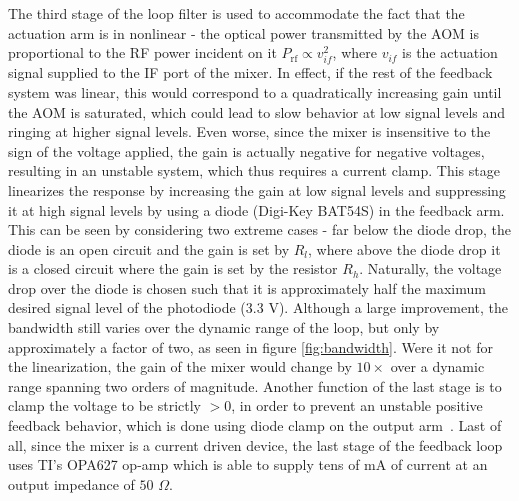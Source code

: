 \documentclass[twocolumn,aps,pra,showpacs,preprintnumbers,bibnotes]{revtex4-1}
\begin{document}
The third stage of the loop filter is used to accommodate the fact that the actuation arm is in nonlinear - the optical power transmitted by the AOM is proportional to the RF power incident on it $P_{\mathrm{rf}}\propto v_{if}^2$, where $v_{if}$ is the actuation signal supplied to the IF port of the mixer.
In effect, if the rest of the feedback system was linear, this would correspond to a quadratically increasing gain until the AOM is saturated, which could lead to slow behavior at low signal levels and ringing at higher signal levels.
Even worse, since the mixer is insensitive to the sign of the voltage applied, the gain is actually negative for negative voltages, resulting in an unstable system, which thus requires a current clamp.
This stage linearizes the response by increasing the gain at low signal levels and suppressing it at high signal levels by using a diode (Digi-Key BAT54S) in the feedback arm.
This can be seen by considering two extreme cases - far below the diode drop, the diode is an open circuit and the gain is set by $R_l$, where above the diode drop it is a closed circuit where the gain is set by the resistor $R_h$. 
Naturally, the voltage drop over the diode is chosen such that it is approximately half the maximum desired signal level of the photodiode ($3.3$ V).
Although a large improvement, the bandwidth still varies over the dynamic range of the loop, but only by approximately a factor of two, as seen in figure \ref{fig:bandwidth}.
Were it not for the linearization, the gain of the mixer would change by $10\times$ over a dynamic range spanning two orders of magnitude.
Another function of the last stage is to clamp the voltage to be strictly $>0$, in order to prevent an unstable positive feedback behavior, which is done using diode clamp on the output arm~\cite{Horowitz2015}.
Last of all, since the mixer is a current driven device, the last stage of the feedback loop uses TI's OPA627 op-amp which is able to supply tens of mA of current at an output impedance of $50$ $\Omega$.
\end{document}
